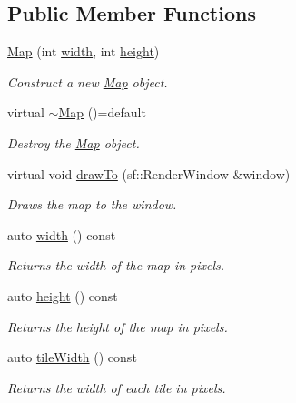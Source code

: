 \subsection*{Public Member Functions}
\begin{DoxyCompactItemize}
\item 
\mbox{\hyperlink{classMap_a8497952fd6e1f0584d868e6ceb97d42d}{Map}} (int \mbox{\hyperlink{classMap_a22c34c8f3c83d69a4ceceefbaf3eec07}{width}}, int \mbox{\hyperlink{classMap_a66196099a6d3dac0df04189446d2adb8}{height}})
\begin{DoxyCompactList}\small\item\em Construct a new \mbox{\hyperlink{classMap}{Map}} object. \end{DoxyCompactList}\item 
virtual \mbox{\hyperlink{classMap_a1debdd8c6fec2993906ec9626045c80c}{$\sim$\+Map}} ()=default
\begin{DoxyCompactList}\small\item\em Destroy the \mbox{\hyperlink{classMap}{Map}} object. \end{DoxyCompactList}\item 
virtual void \mbox{\hyperlink{classMap_acbc620429ff8e8de0a62ad322581535f}{draw\+To}} (sf\+::\+Render\+Window \&window)
\begin{DoxyCompactList}\small\item\em Draws the map to the window. \end{DoxyCompactList}\item 
auto \mbox{\hyperlink{classMap_a22c34c8f3c83d69a4ceceefbaf3eec07}{width}} () const
\begin{DoxyCompactList}\small\item\em Returns the width of the map in pixels. \end{DoxyCompactList}\item 
auto \mbox{\hyperlink{classMap_a66196099a6d3dac0df04189446d2adb8}{height}} () const
\begin{DoxyCompactList}\small\item\em Returns the height of the map in pixels. \end{DoxyCompactList}\item 
auto \mbox{\hyperlink{classMap_aad00fc857019548a36d64436d03360e9}{tile\+Width}} () const
\begin{DoxyCompactList}\small\item\em Returns the width of each tile in pixels. \end{DoxyCompactList}\item 

\end{DoxyCompactItemize}
